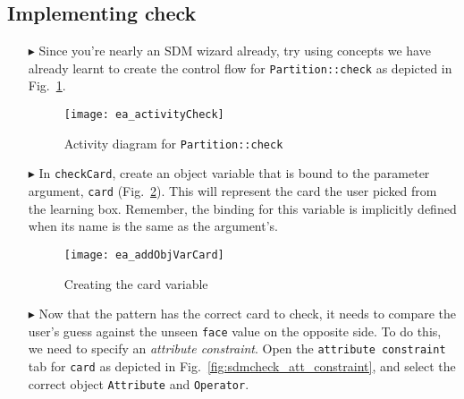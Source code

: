 \newpage
\hypertarget{checkCard vis}{}
\subsection{Implementing check}
\visHeader

\begin{itemize}

\vspace{1cm}

\item[$\blacktriangleright$] Since you're nearly an SDM wizard already, try using concepts we have already learnt to create the control flow for
\texttt{Partition::check} as depicted in Fig.~\ref{fig:sdm_check_start}.

\vspace{1cm}

\begin{figure}[htbp]
\begin{center}
  \texttt{[image: ea\_activityCheck]}
  \caption{Activity diagram for \texttt{Partition::check}}
  \label{fig:sdm_check_start}
\end{center}
\end{figure}

\vspace{1cm}

\item[$\blacktriangleright$] In \texttt{checkCard}, create an object variable that is bound to the parameter argument, \texttt{card} 
(Fig.~\ref{fig:sdm_check_addCard}). This will represent the card the user picked from the learning box. Remember, the binding for this variable is implicitly
defined when its name is the same as the argument's.

\begin{figure}[htbp]
\begin{center}
  \texttt{[image: ea\_addObjVarCard]}
  \caption{Creating the card variable}
  \label{fig:sdm_check_addCard}
\end{center}
\end{figure}

\clearpage

\item[$\blacktriangleright$] Now that the pattern has the correct card to check, it needs to compare the user's guess against the unseen \texttt{face} value on
the opposite side. To do this, we need to specify an \emph{attribute constraint}. Open the \texttt{attribute constraint} tab for \texttt{card} as depicted in
Fig.~\ref{fig:sdmcheck_att_constraint}, and select the correct object \texttt{Attribute} and \texttt{Operator}.


\end{itemize}
